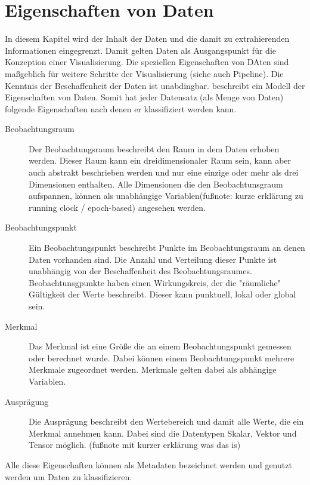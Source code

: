 \documentclass[a4paper, 12pt, DIVcalc, onepage, pdftex, headsepline, footsepline]{scrreprt}
\begin{document}
\section{Eigenschaften von Daten}
\label{sec:EigenschaftenDaten}
In diesem Kapitel wird der Inhalt der Daten und die damit zu extrahierenden Informationen eingegrenzt.
Damit gelten Daten als Ausgangspunkt für die Konzeption einer Visualisierung. Die speziellen
Eigenschaften von DAten sind maßgeblich für weitere Schritte der Visualisierung (siehe auch Pipeline).
Die Kenntnis der Beschaffenheit der Daten ist unabdingbar.
\cite{Schumann} beschreibt ein Modell der Eigenschaften von Daten. Somit hat jeder Datensatz (als Menge von
Daten) folgende Eigenschaften nach denen er klassifiziert werden kann.
\begin{description}
\item[Beobachtungsraum]
Der Beobachtungsraum beschreibt den Raum in dem Daten erhoben werden. Dieser Raum kann ein
dreidimensionaler Raum sein, kann aber auch abstrakt beschrieben werden und nur eine einzige oder
mehr als drei Dimensionen enthalten. Alle Dimensionen die den Beobachtunsgraum aufspannen,
können als unabhängige Variablen(fußnote: kurze erklärung zu running clock / epoch-based) angesehen werden.
\item[Beobachtungspunkt]
Ein Beobachtungspunkt beschreibt Punkte im Beobachtungsraum an denen Daten vorhanden sind. Die Anzahl und Verteilung
dieser Punkte ist unabhängig von der Beschaffenheit des Beobachtungsraumes. Beobachtunsgpunkte haben einen
Wirkungskreis, der die "räumliche" Gültigkeit der Werte beschreibt. Dieser kann punktuell, lokal oder global sein.
\item[Merkmal]
Das Merkmal ist eine Größe die an einem Beobachtungspunkt gemessen oder berechnet wurde. Dabei können
einem Beobachtungspunkt mehrere Merkmale zugeordnet werden. Merkmale gelten dabei als abhängige Variablen.
\item[Ausprägung]
Die Ausprägung beschreibt den Wertebereich und damit alle Werte, die ein Merkmal annehmen kann.
Dabei sind die Datentypen Skalar, Vektor und Tensor möglich. (fußnote mit kurzer erklärung was das is)
\end{description}
Alle diese Eigenschaften können als Metadaten bezeichnet werden und genutzt werden um Daten zu klassifizieren.
\end{document}
